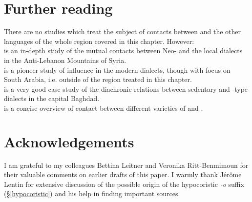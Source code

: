 \documentclass[output=paper]{langsci/langscibook}
\begin{document}
\section*{Further reading}

There are no studies which treat the subject of contacts between  and the other languages of the whole region covered in this chapter. However:\\
\citet{ArnoldBehnstedt1993} is an in-depth study of the mutual contacts between  Neo- and the local  dialects in the Anti-Lebanon Mountains of Syria.\\
\citet{Diem1979} is a pioneer study of  influence in the modern  dialects, though with focus on South Arabia, i.e. outside of the region treated in this chapter.\\
\citet{Palva2009} is a very good case study of the diachronic relations between sedentary and -type dialects in the  capital Baghdad.\\
\citet{Weninger2011Aramaic} is a concise overview of contact between different varieties of  and .

\section*{Acknowledgements}
I am grateful to my colleagues Bettina Leitner and Veronika Ritt-Benmimoun for their valuable comments on earlier drafts of this paper. I warmly thank Jérôme Lentin for extensive discussion of the possible origin of the hypocoristic \textit{-o} suffix (§\ref{hypocoristic}) and his help in finding important sources.

\newpage
\end{document}
